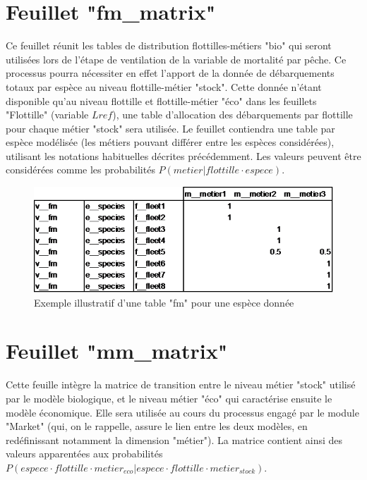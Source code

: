 \documentclass[12pt, colorinlistoftodos, notitlepage]{report}
\newenvironment{not used}[1]{%
    \longtable{%
        |>{\centering$\displaystyle}A{#1}{1}<{$}%
        |}\hline\ignorespaces}{%
    \endlongtable\ignorespacesafterend}
\begin{document}
\section{Feuillet "fm\_matrix"}

Ce feuillet réunit les tables de distribution flottilles-métiers "bio" qui seront utilisées lors de l'étape de ventilation de la variable de mortalité par pêche. Ce processus pourra nécessiter en effet l'apport de la donnée de débarquements totaux par espèce au niveau flottille-métier "stock". Cette donnée n'étant disponible qu'au niveau flottille et flottille-métier "éco" dans les feuillets "Flottille" (variable $Lref$), une table d'allocation des débarquements par flottille pour chaque métier "stock" sera utilisée. Le feuillet contiendra une table par espèce modélisée (les métiers pouvant différer entre les espèces considérées), utilisant les notations habituelles décrites précédemment. Les valeurs peuvent être considérées comme les probabilités $P (metier | flottille \cdot espece)$.

\begin{figure}[h!]
    \begin{center}
    \includegraphics[width = 13.4cm]{figures/param/stock9.png}
    \end{center}
    \caption{Exemple illustratif d'une table "fm" pour une espèce donnée}
    \label{fig:fm}
\end{figure}


\section{Feuillet "mm\_matrix"}

Cette feuille intègre la matrice de transition entre le niveau métier "stock" utilisé par le modèle biologique, et le niveau métier "éco" qui caractérise ensuite le modèle économique. Elle sera utilisée au cours du processus engagé par le module "Market" (qui, on le rappelle, assure le lien entre les deux modèles, en redéfinissant notamment la dimension "métier"). La matrice contient ainsi des valeurs apparentées aux probabilités $P(espece \cdot flottille \cdot metier_{eco} | espece \cdot flottille \cdot metier_{stock})$.
\end{document}
